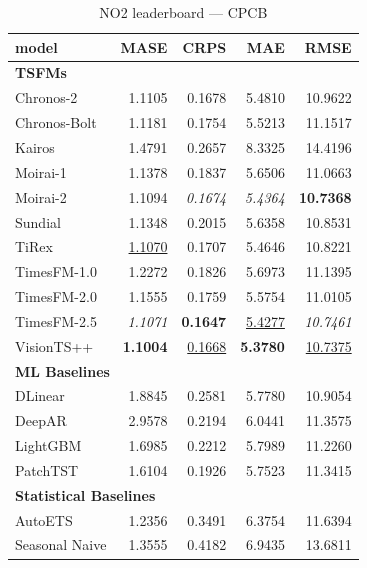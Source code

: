 \begin{table}[H]
\caption{NO2 leaderboard --- CPCB}
\centering
\begin{small}
\begin{tabular}{lrrrr}
\toprule
model & MASE & CRPS & MAE & RMSE \\
\midrule
\multicolumn{5}{l}{\textbf{TSFMs}} \\
Chronos-2 & 1.1105 & 0.1678 & 5.4810 & 10.9622 \\
Chronos-Bolt & 1.1181 & 0.1754 & 5.5213 & 11.1517 \\
Kairos & 1.4791 & 0.2657 & 8.3325 & 14.4196 \\
Moirai-1 & 1.1378 & 0.1837 & 5.6506 & 11.0663 \\
Moirai-2 & 1.1094 & \textit{0.1674} & \textit{5.4364} & \textbf{10.7368} \\
Sundial & 1.1348 & 0.2015 & 5.6358 & 10.8531 \\
TiRex & \underline{1.1070} & 0.1707 & 5.4646 & 10.8221 \\
TimesFM-1.0 & 1.2272 & 0.1826 & 5.6973 & 11.1395 \\
TimesFM-2.0 & 1.1555 & 0.1759 & 5.5754 & 11.0105 \\
TimesFM-2.5 & \textit{1.1071} & \textbf{0.1647} & \underline{5.4277} & \textit{10.7461} \\
VisionTS++ & \textbf{1.1004} & \underline{0.1668} & \textbf{5.3780} & \underline{10.7375} \\
\midrule
\multicolumn{5}{l}{\textbf{ML Baselines}} \\
DLinear & 1.8845 & 0.2581 & 5.7780 & 10.9054 \\
DeepAR & 2.9578 & 0.2194 & 6.0441 & 11.3575 \\
LightGBM & 1.6985 & 0.2212 & 5.7989 & 11.2260 \\
PatchTST & 1.6104 & 0.1926 & 5.7523 & 11.3415 \\
\midrule
\multicolumn{5}{l}{\textbf{Statistical Baselines}} \\
AutoETS & 1.2356 & 0.3491 & 6.3754 & 11.6394 \\
Seasonal Naive & 1.3555 & 0.4182 & 6.9435 & 13.6811 \\
\bottomrule
\end{tabular}
\end{small}
\end{table}